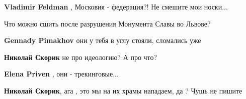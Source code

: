 \begin{itemize}
\begin{itemize}
 
\textbf{Vladimir Feldman} , Московия - федерация?! Не смешите мои носки...

 
Что можно сшить после разрушения Монумента Славы во Львове?

 
\textbf{Gennady Pimakhov} они у тебя в углу стояли, сломались уже

 
\textbf{Николай Скорик} не про идеологию? А про что?

 
\textbf{Elena Priven} , они - трекинговые...

 
\textbf{Николай Скорик}, ага , это мы на их храмы нападаем, да ?
Чушь не пишите

 

\end{itemize}
\end{itemize}
